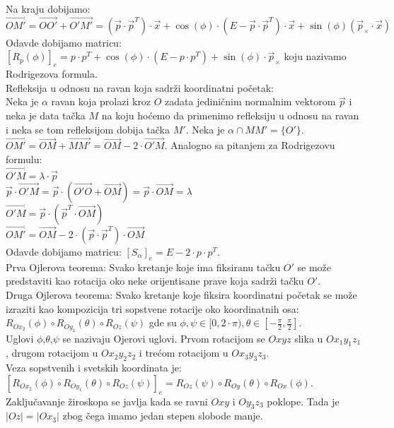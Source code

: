 \documentclass[12pt]{article}
\begin{document}
    Na kraju dobijamo:
    $$\overrightarrow{OM'}=\overrightarrow{OO'}+\overrightarrow{O'M'}=(\overrightarrow{p}\cdot \overrightarrow{p}^T)\cdot \overrightarrow{x}+\cos(\phi)\cdot(E-\overrightarrow{p}\cdot \overrightarrow{p}^T)\cdot \overrightarrow{x}+\sin(\phi)(\overrightarrow{p}_\times\cdot\overrightarrow{x})$$
    Odavde dobijamo matricu: $[R_p(\phi)]_e=p\cdot p^T+\cos(\phi)\cdot(E-p\cdot p^T)+\sin(\phi)\cdot\overrightarrow{p}_\times$ koju nazivamo Rodrigezova formula.\\
    Refleksija u odnosu na ravan koja sadrži koordinatni početak:\\
    Neka je $\alpha$ ravan koja prolazi kroz $O$ zadata jediničnim
    normalnim vektorom $\overrightarrow{p}$ i neka je data tačka $M$
    na koju hoćemo da primenimo refleksiju u odnosu na ravan i neka se
    tom refleksijom dobija tačka $M'$. Neka je $\alpha\cap MM'=\{O'\}$.\\
$\overrightarrow{OM'}=\overrightarrow{OM}+\overrightarrow{MM'}=\overrightarrow{OM}-2\cdot \overrightarrow{O'M}$.
    Analogno sa pitanjem za Rodrigezovu formulu:\\
$\overrightarrow{O'M}=\lambda\cdot\overrightarrow{p}$\\
$\overrightarrow{p}\cdot\overrightarrow{O'M}=\overrightarrow{p}\cdot(\overrightarrow{O'O}+\overrightarrow{OM})=\overrightarrow{p}\cdot\overrightarrow{OM}=\lambda$\\
$\overrightarrow{O'M}=\overrightarrow{p}\cdot (\overrightarrow{p}^T\cdot\overrightarrow{OM})$\\
$\overrightarrow{OM'}=\overrightarrow{OM}-2\cdot(\overrightarrow{p}\cdot \overrightarrow{p}^T)\cdot\overrightarrow{OM}$\\
    Odavde dobijamo matricu: $[S_\alpha]_e=E-2\cdot p\cdot p^T$.\\
    Prva Ojlerova teorema: Svako kretanje koje ima fiksiranu tačku
$O'$ se može predstaviti kao rotacija oko neke orijentisane
    prave koja sadrži tačku $O'$.\\
    Druga Ojlerova teorema: Svako kretanje koje fiksira koordinatni
    početak se može izraziti kao kompozicija tri sopstvene rotacije
    oko koordinatnih osa:\\
$R_{Ox_2}(\phi)\circ R_{Oy_1}(\theta)\circ R_{Oz}(\psi)$ gde su $\phi,\psi\in[0,2\cdot\pi),\theta\in[-\frac{\pi}{2},\frac{\pi}{2}]$.\\
    Uglovi $\phi$,$\theta$,$\psi$ se nazivaju Ojerovi uglovi. Prvom rotacijom se $Oxyz$ slika u $Ox_1y_1z_1$,
    drugom rotacijom u $Ox_2y_2z_2$ i trećom rotacijom u $Ox_3y_3z_3$.\\
    Veza sopstvenih i svetskih koordinata je:\\
$[R_{Ox_2}(\phi)\circ R_{Oy_1}(\theta)\circ R_{Oz}(\psi)]_e = R_{Oz}(\psi)\circ R_{Oy}(\theta)\circ R_{Ox}(\phi)$.\\
    Zaključavanje žiroskopa se javlja kada se ravni $Oxy$ i $Oy_3z_3$ poklope. Tada
    je $|Oz|=|Ox_3|$ zbog čega imamo jedan stepen slobode manje.
    \par
\end{document}

